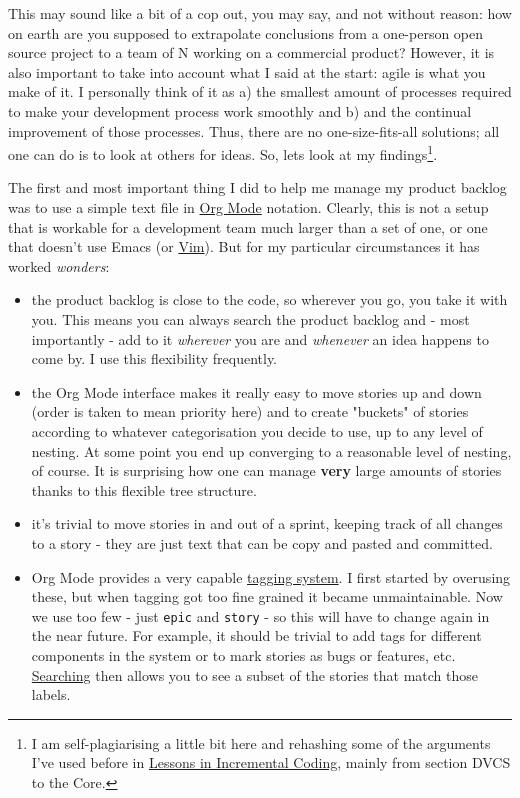 \documentclass{book}
\begin{document}
This may sound like a bit of a cop out, you may say, and not without
reason: how on earth are you supposed to extrapolate conclusions from
a one-person open source project to a team of N working on a
commercial product? However, it is also important to take into account
what I said at the start: agile is what you make of it. I personally
think of it as a) the smallest amount of processes required to make
your development process work smoothly and b) and the continual
improvement of those processes. Thus, there are no one-size-fits-all
solutions; all one can do is to look at others for ideas. So, lets
look at my findings\footnote{I am self-plagiarising a little bit here and
rehashing some of the arguments I've used before in \href{http://mcraveiro.blogspot.co.uk/2014/09/nerd-food-dogen-lessons-in-incremental.html}{Lessons in
Incremental Coding}, mainly from section DVCS to the Core.}.

The first and most important thing I did to help me manage my product
backlog was to use a simple text file in \href{http://orgmode.org/}{Org Mode} notation. Clearly,
this is not a setup that is workable for a development team much
larger than a set of one, or one that doesn't use Emacs (or \href{https://github.com/hsitz/VimOrganizer}{Vim}). But
for my particular circumstances it has worked \emph{wonders}:

\begin{itemize}
\item the product backlog is close to the code, so wherever you go, you
take it with you. This means you can always search the product
backlog and - most importantly - add to it \emph{wherever} you are and
\emph{whenever} an idea happens to come by. I use this flexibility
frequently.
\item the Org Mode interface makes it really easy to move stories up and
down (order is taken to mean priority here) and to create "buckets"
of stories according to whatever categorisation you decide to use,
up to any level of nesting. At some point you end up converging to a
reasonable level of nesting, of course. It is surprising how one can
manage \textbf{very} large amounts of stories thanks to this flexible tree
structure.
\item it's trivial to move stories in and out of a sprint, keeping track
of all changes to a story - they are just text that can be copy and
pasted and committed.
\item Org Mode provides a very capable \href{http://orgmode.org/manual/Tags.html}{tagging system}. I first started by
overusing these, but when tagging got too fine grained it became
unmaintainable. Now we use too few - just \texttt{epic} and \texttt{story} - so
this will have to change again in the near future. For example, it
should be trivial to add tags for different components in the system
or to mark stories as bugs or features, etc. \href{http://orgmode.org/manual/Tag-searches.html#Tag-searches}{Searching} then allows
you to see a subset of the stories that match those labels.
\end{itemize}
\end{document}
